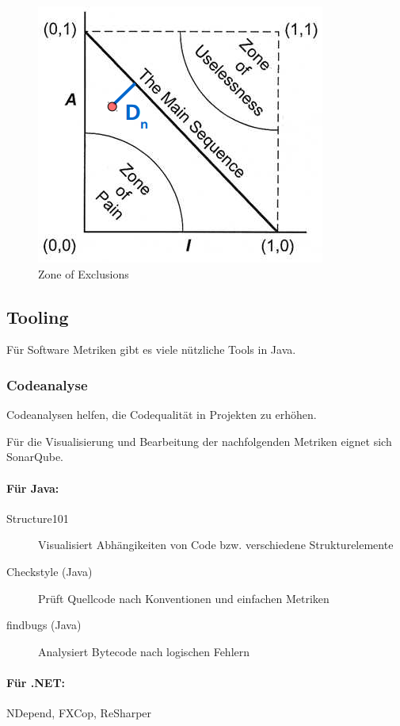 \begin{figure}[h!]
	\centering
	\includegraphics[width=0.5\linewidth]{img/abstractness_intability}
	\caption{Zone of Exclusions}
	\label{fig:abstractnessintability}
\end{figure}



\subsection{Tooling}
Für Software Metriken gibt es viele nützliche Tools in Java.

\subsubsection{Codeanalyse}

Codeanalysen helfen, die Codequalität in Projekten zu erhöhen.

Für die Visualisierung und Bearbeitung der nachfolgenden Metriken eignet sich SonarQube.

\paragraph{Für Java:}
\begin{description}
	\item[Structure101] Visualisiert Abhängikeiten von Code bzw. verschiedene Strukturelemente
	\item[Checkstyle (Java)] Prüft Quellcode nach Konventionen und einfachen Metriken
	\item[findbugs (Java)] Analysiert Bytecode nach logischen Fehlern
\end{description}

\paragraph{Für .NET:} NDepend, FXCop, ReSharper

